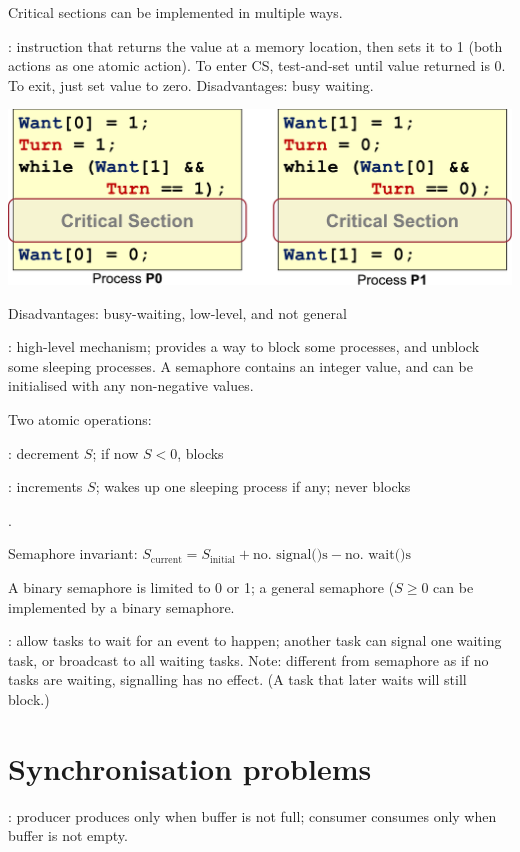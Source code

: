 \documentclass[fontsize=9pt,twoside]{slnotes}
\begin{document}
Critical sections can be implemented in multiple ways.

: instruction that returns the value at a memory location, then sets it to 1 (both actions as one atomic action). To enter CS, test-and-set until value returned is 0. To exit, just set value to zero. Disadvantages: busy waiting.


\includegraphics[width=\columnwidth]{petersons.pdf}

Disadvantages: busy-waiting, low-level, and not general

: high-level mechanism; provides a way to block some processes, and unblock some sleeping processes. A semaphore contains an integer value, and can be initialised with any non-negative values.

Two atomic operations: \begin{slinenum}
\item {}: decrement \(S\); if now \(S < 0\), blocks
\item {}: increments \(S\); wakes up one sleeping process if any; never blocks
\end{slinenum}.

Semaphore invariant: \(S_{\text{current}} = S_{\text{initial}} + \text{no. signal()s} - \text{no. wait()s}\)

A binary semaphore is limited to 0 or 1; a general semaphore (\(S \ge 0\) can be implemented by a binary semaphore.

: allow tasks to wait for an event to happen; another task can signal one waiting task, or broadcast to all waiting tasks. Note: different from semaphore as if no tasks are waiting, signalling has no effect. (A task that later waits will still block.)

\section{Synchronisation problems}
: producer produces only when buffer is not full; consumer consumes only when buffer is not empty.
\end{document}
